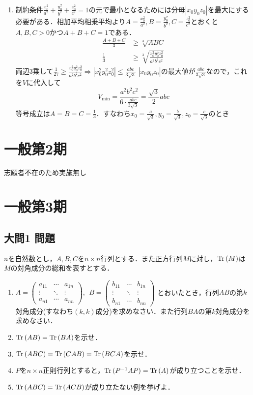 \documentclass[dvipdfmx]{jsreport}
\begin{document}
\begin{souanswer}
\begin{enumerate}
	\item 制約条件$\frac{x_0^2}{a^2}+ \frac{y_0^2}{b^2}+ \frac{z_0^2}{c^2}= 1$の元で最小となるためには分母$|x_0y_0z_0|$を最大にする必要がある．相加平均相乗平均より$A= \frac{x_0^2}{a^2}, B= \frac{y_0^2}{b^2}, C= \frac{z_0^2}{c^2}$とおくと$A, B, C> 0$かつ$A+ B+ C= 1$である．
\begin{align*}
	\frac{A+ B+ C}{3}&\ge \sqrt[3]{ABC}\\
	\frac{1}{3}&\ge \sqrt[3]{\frac{x_0^2y_0^2z_0^2}{a^2b^2c^2}}
\end{align*}
	両辺3乗して$\frac{1}{27}\ge \frac{x_0^2y_0^2z_0^2}{a^2b^2c^2}\Rightarrow |x_0^2y_0^2z_0^2|\le \frac{abc}{3\sqrt{3}}$
	$|x_0y_0z_0|$の最大値が$\frac{abc}{3\sqrt{3}}$なので，これを$V$に代入して
\begin{equation*}
	V_\mathrm{min}= \frac{a^2b^2c^2}{6\cdot \frac{abc}{3\sqrt{3}}}= \frac{\sqrt{3}}{2}abc
\end{equation*}
	等号成立は$A= B= C= \frac{1}{3}$．すなわち$x_0= \frac{a}{\sqrt{3}}, y_0= \frac{b}{\sqrt{3}}, z_0= \frac{c}{\sqrt{3}}$のとき
\end{enumerate}
\end{souanswer}
\chapter{一般第2期}
	志願者不在のため実施無し
\chapter{一般第3期}
\section{大問1 問題}
\begin{tcolorbox} %
	$n$を自然数とし，$A, B, C$を$n\times n$行列とする．また正方行列$M$に対し，$\operatorname{Tr}{(M)}$は$M$の対角成分の総和を表すとする．
\begin{enumerate}
	\item $
	A= 
\begin{pmatrix}
	a_{11}& \cdots& a_{1n}\\
	\vdots& \ddots& \vdots\\
	a_{n1}& \cdots& a_{nn}
\end{pmatrix},\ \ 
	B= 
\begin{pmatrix}
	b_{11}& \cdots& b_{1n}\\
	\vdots& \ddots& \vdots\\
	b_{n1}& \cdots& b_{nn}
\end{pmatrix}$
	とおいたとき，行列$AB$の第$k$対角成分(すなわち$(k, k)$成分)を求めなさい．また行列$BA$の第$k$対角成分を求めなさい．
	\item $\operatorname{Tr}{(AB)}= \operatorname{Tr}{(BA)}$を示せ．
	\item $\operatorname{Tr}{(ABC)}= \operatorname{Tr}{(CAB)}= \operatorname{Tr}{(BCA)}$を示せ．
	\item $P$を$n\times n$正則行列とすると，$\operatorname{Tr}{(P^{-1}AP)}= \operatorname{Tr}{(A)}$が成り立つことを示せ．
	\item $\operatorname{Tr}{(ABC)}= \operatorname{Tr}{(ACB)}$が成り立たない例を挙げよ．
\end{enumerate}
\end{tcolorbox}
\end{document}
